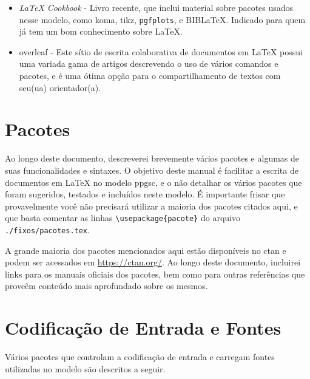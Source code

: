 \begin{itemize}
	\item \textit{\LaTeX{} Cookbook} \parencite{Kottwitz2015} - Livro recente, que inclui material sobre pacotes usados nesse modelo, como \gls{koma}, \gls{tikz}, \texttt{pgfplots}, e BIB\LaTeX{}. Indicado para quem já tem um bom conhecimento sobre \LaTeX{}.
	
	\item \gls{overleaf} - Este sítio de escrita colaborativa de documentos em \LaTeX{} possui uma variada gama de artigos descrevendo o uso de vários comandos e pacotes, e é uma ótima opção para o compartilhamento de textos com seu(ua) orientador(a).
	
\end{itemize}

\section{Pacotes}

Ao longo deste documento, descreverei brevemente vários pacotes e algumas de suas funcionalidades e sintaxes. O objetivo deste manual é facilitar a escrita de documentos em \LaTeX{} no modelo \gls{ppgsc}, e o não detalhar os vários pacotes que foram sugeridos, testados e incluídos neste modelo. É importante frisar que provavelmente você não precisará utilizar a maioria dos pacotes citados aqui, e que basta comentar as linhas \texttt{\textbackslash usepackage\{pacote\}} do arquivo \texttt{./fixos/pacotes.tex}.

A grande maioria dos pacotes mencionados aqui estão disponíveis no \gls{ctan} e podem ser acessados em \url{https://ctan.org/}. Ao longo deste documento, incluirei links para os manuais oficiais dos pacotes, bem como para outras referências que proveêm conteúdo mais aprofundado sobre os mesmos.

\section{Codificação de Entrada e Fontes}

Vários pacotes que controlam a codificação de entrada e carregam fontes utilizadas no modelo são descritos a seguir.

